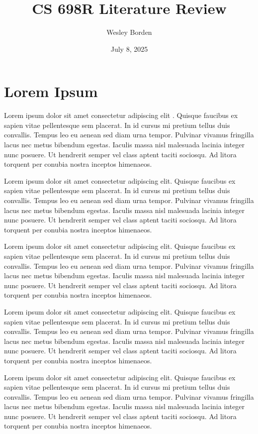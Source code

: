\documentclass[11pt]{article}
\title{CS 698R Literature Review}
\author{Wesley Borden}
\date{July 8, 2025}
\newcommand{\sectionwithindent}[1]{
    \section*{#1}
    \hspace{\parindent} %
}
\begin{document}
\sectionwithindent{Lorem Ipsum}
Lorem ipsum dolor sit amet consectetur adipiscing elit \cite{white1986structure, emmons2015connectomics}. Quisque faucibus ex sapien vitae pellentesque sem placerat. In id cursus mi pretium tellus duis convallis. Tempus leo eu aenean sed diam urna tempor. Pulvinar vivamus fringilla lacus nec metus bibendum egestas. Iaculis massa nisl malesuada lacinia integer nunc posuere. Ut hendrerit semper vel class aptent taciti sociosqu. Ad litora torquent per conubia nostra inceptos himenaeos.

Lorem ipsum dolor sit amet consectetur adipiscing elit. Quisque faucibus ex sapien vitae pellentesque sem placerat. In id cursus mi pretium tellus duis convallis. Tempus leo eu aenean sed diam urna tempor. Pulvinar vivamus fringilla lacus nec metus bibendum egestas. Iaculis massa nisl malesuada lacinia integer nunc posuere. Ut hendrerit semper vel class aptent taciti sociosqu. Ad litora torquent per conubia nostra inceptos himenaeos.

Lorem ipsum dolor sit amet consectetur adipiscing elit. Quisque faucibus ex sapien vitae pellentesque sem placerat. In id cursus mi pretium tellus duis convallis. Tempus leo eu aenean sed diam urna tempor. Pulvinar vivamus fringilla lacus nec metus bibendum egestas. Iaculis massa nisl malesuada lacinia integer nunc posuere. Ut hendrerit semper vel class aptent taciti sociosqu. Ad litora torquent per conubia nostra inceptos himenaeos.

Lorem ipsum dolor sit amet consectetur adipiscing elit. Quisque faucibus ex sapien vitae pellentesque sem placerat. In id cursus mi pretium tellus duis convallis. Tempus leo eu aenean sed diam urna tempor. Pulvinar vivamus fringilla lacus nec metus bibendum egestas. Iaculis massa nisl malesuada lacinia integer nunc posuere. Ut hendrerit semper vel class aptent taciti sociosqu. Ad litora torquent per conubia nostra inceptos himenaeos.

Lorem ipsum dolor sit amet consectetur adipiscing elit. Quisque faucibus ex sapien vitae pellentesque sem placerat. In id cursus mi pretium tellus duis convallis. Tempus leo eu aenean sed diam urna tempor. Pulvinar vivamus fringilla lacus nec metus bibendum egestas. Iaculis massa nisl malesuada lacinia integer nunc posuere. Ut hendrerit semper vel class aptent taciti sociosqu. Ad litora torquent per conubia nostra inceptos himenaeos.

\newpage
\printbibliography
\end{document}
